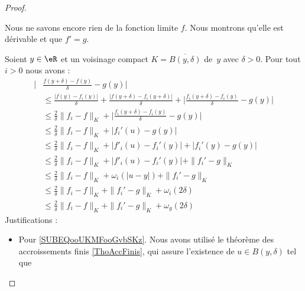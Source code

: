 \begin{proof}
\begin{subproof}
		Nous ne savons encore rien de la fonction limite \( f\). Nous montrons qu'elle est dérivable et que \( f'=g\).

		Soient \( y\in \eR\) et un voisinage compact \( K=\overline{ B(y,\delta) }\) de~\( y\) avec \( \delta>0\). Pour tout \( i>0\) nous avons :
		\begin{subequations}
			\begin{align}
				\Big| & \frac{ f(y+\delta)-f(y) }{ \delta }  - g(y) \Big|                                                                                                   \\
				      & \leq   \frac{ | f(y)-f_i(y)|}{ \delta }  +\frac{ | f(y+\delta)-f_i(y+\delta) | }{ \delta }+\big| \frac{ f_i(y+\delta)-f_i(y) }{ \delta }-g(y) \big| \\
				      & \leq \frac{ 2 }{ \delta } \|f_i - f\|_K + \big| \frac{ f_i(y+\delta)-f_i(y) }{ \delta }-g(y) \big|                                                  \\
				      & \leq \frac{ 2 }{ \delta }\| f_i-f \|_K+| f_i'(u)-g(y) |  \label{SUBEQooUKMFooGvbSKz}                                                                \\
				      & \leq \frac{ 2 }{ \delta }\| f_i-f \|_K+| f'_i(u)-f_i'(y) |+| f_i'(y)-g(y) |                                                                         \\
				      & \leq \frac{ 2 }{ \delta }\| f_i-f \|_K+| f'_i(u)-f_i'(y) |+\| f_i'-g \|_K  \label{SUBEQooWHLZooCGTjeH}                                              \\
				      & \leq \frac{ 2 }{ \delta }\| f_i-f \|_K+   \omega_i(| u-y |)    +\| f_i'-g \|_K                                                                      \\
				      & \leq \frac{ 2 }{ \delta }\| f_i-f \|_K      +\| f_i'-g \|_K + \omega_i(2\delta)    \label{SUBEQooVRWIooCwEWPE}                                      \\
				      & \leq \frac{ 2 }{ \delta }\| f_i-f \|_K      +\| f_i'-g \|_K + \omega_g(2\delta)    \label{SUBEQooQNMMooRsAjyb}                                      
			\end{align}
		\end{subequations}
		Justifications :
		\begin{itemize}
			\item
			      Pour \ref{SUBEQooUKMFooGvbSKz}. Nous avons utilisé le théorème des accroissements finis \ref{ThoAccFinis}, qui assure l'existence de \( u\in B(y,\delta) \) tel que

\end{itemize}
\end{subproof}
\end{proof}
